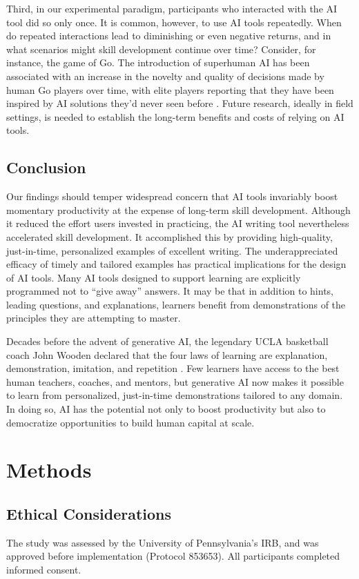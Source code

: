 \documentclass[11pt]{report}
\begin{document}
\begin{mainf}
Third, in our experimental paradigm, participants who interacted with the AI tool did so only once. 
  It is common, however, to use AI tools repeatedly. 
  When do repeated interactions lead to diminishing or even negative returns, and in what scenarios might skill development continue over time?  Consider, for instance, the game of Go. The introduction of superhuman AI has been associated with an increase in the novelty and quality of decisions made by human Go players over time, with elite players reporting that they have been inspired by AI solutions they'd never seen before \cite{shin2023}.     
  Future research, ideally in field settings, is needed to establish the long-term benefits and costs of relying on AI tools.


\subsection{Conclusion}
Our findings should temper widespread concern that AI tools invariably boost momentary productivity at the expense of long-term skill development.  
  Although it reduced the effort users invested in practicing, the AI writing tool nevertheless accelerated skill development.
  It accomplished this by providing high-quality, just-in-time, personalized examples of excellent writing.
  The underappreciated efficacy of timely and tailored examples has practical implications for the design of AI tools. 
  Many AI tools designed to support learning are explicitly programmed not to ``give away'' answers. 
  It may be that in addition to hints, leading questions, and explanations, learners benefit from demonstrations of the principles they are attempting to master.
  
  Decades before the advent of generative AI, the legendary UCLA basketball coach John Wooden declared that the four laws of learning are explanation, demonstration, imitation, and repetition \cite{whut2010}. 
  Few learners have access to the best human teachers, coaches, and mentors, but generative AI now makes it possible to learn from personalized, just-in-time demonstrations tailored to any domain. 
  In doing so, AI has the potential not only to boost productivity but also to democratize opportunities to build human capital at scale.

\section{Methods}
\subsection{Ethical Considerations}
The study was assessed by the University of Pennsylvania's IRB, and was approved before implementation (Protocol 853653). All participants completed informed consent.


\end{mainf}
\end{document}
